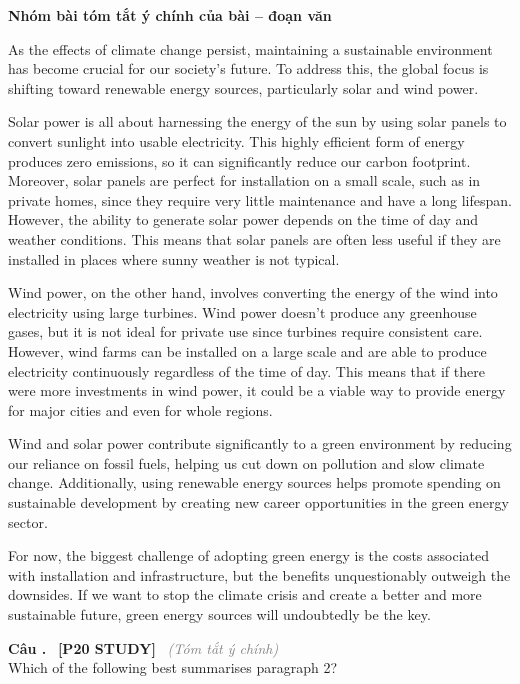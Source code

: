 \documentclass[12pt,a4paper,twoside]{article}
\newcounter{qcounter}
\newcommand{\question}[2][]{%
    \stepcounter{qcounter}%
    \par\vspace{6pt}%
    \noindent\textcolor{primaryBlue}{\textbf{Câu \theqcounter.}}~%
    \textcolor{secondaryBlue}{\small\textbf{[P20 STUDY]}}~%
    \if\relax\detokenize{#1}\relax\else\textcolor{gray}{\small\textit{(#1)}}~\fi\\[1pt]
    \noindent #2%
}
\newenvironment{readingpassage}[1][]{%
    \begin{tcolorbox}[enhanced, colback=grayLight, colframe=secondaryBlue,
        coltitle=textDark, fonttitle=\bfseries, title={#1},
        rounded corners, arc=3mm, boxrule=1pt,
        left=15pt, right=15pt, top=10pt, bottom=10pt,
        breakable, before skip=10pt, after skip=10pt, drop fuzzy shadow]
    \setstretch{1.3}
}{\end{tcolorbox}}
\begin{document}
\setcounter{qcounter}{0}
\begin{groupbox}\textbf{\large Nhóm bài tóm tắt ý chính của bài -- đoạn văn}\end{groupbox}
\begin{readingpassage}[]
As the effects of climate change persist, maintaining a sustainable environment has become crucial for our society's future. To address this, the global focus is shifting toward renewable energy sources, particularly solar and wind power.

Solar power is all about harnessing the energy of the sun by using solar panels to convert sunlight into usable electricity. This highly efficient form of energy produces zero emissions, so it can significantly reduce our carbon footprint. Moreover, solar panels are perfect for installation on a small scale, such as in private homes, since they require very little maintenance and have a long lifespan. However, the ability to generate solar power depends on the time of day and weather conditions. This means that solar panels are often less useful if they are installed in places where sunny weather is not typical.

Wind power, on the other hand, involves converting the energy of the wind into electricity using large turbines. Wind power doesn't produce any greenhouse gases, but it is not ideal for private use since turbines require consistent care. However, wind farms can be installed on a large scale and are able to produce electricity continuously regardless of the time of day. This means that if there were more investments in wind power, it could be a viable way to provide energy for major cities and even for whole regions.

Wind and solar power contribute significantly to a green environment by reducing our reliance on fossil fuels, helping us cut down on pollution and slow climate change. Additionally, using renewable energy sources helps promote spending on sustainable development by creating new career opportunities in the green energy sector.

For now, the biggest challenge of adopting green energy is the costs associated with installation and infrastructure, but the benefits unquestionably outweigh the downsides. If we want to stop the climate crisis and create a better and more sustainable future, green energy sources will undoubtedly be the key.
\end{readingpassage}

\question[Tóm tắt ý chính]{Which of the following best summarises paragraph 2?}
\end{document}
